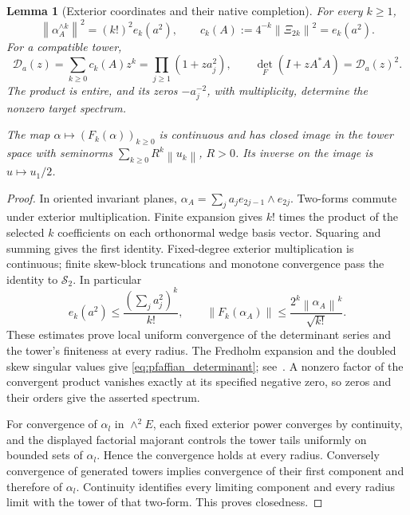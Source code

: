 \documentclass[11pt,a4paper]{amsart}
\numberwithin{equation}{section}
\newtheorem{lemma}[theorem]{Lemma}
\theoremstyle{definition}
\theoremstyle{remark}
\newcommand{\Sch}{\mathcal S}
\newcommand{\norm}[1]{\left\lVert#1\right\rVert}
\begin{document}
\begin{lemma}[Exterior coordinates and their native completion]\label{lem:pfaffian_exterior}
For every $k\ge1$,
\begin{equation}\label{eq:pfaffian_elementary}
 \norm{\alpha_A^{\wedge k}}^2=(k!)^2e_k(a^2),\qquad
 c_k(A):=4^{-k}\norm{\Xi_{2k}}^2=e_k(a^2).
\end{equation}
For a compatible tower,
\begin{equation}\label{eq:pfaffian_determinant}
 \mathscr D_a(z)=\sum_{k\ge0}c_k(A)z^k
 =\prod_{j\ge1}(1+za_j^2),\qquad
 \det_F(I+zA^*A)=\mathscr D_a(z)^2.
\end{equation}
The product is entire, and its zeros $-a_j^{-2}$, with multiplicity, determine the nonzero target spectrum.

The map $\alpha\mapsto(F_k(\alpha))_{k\ge0}$ is continuous and has closed image in the tower space with seminorms
$\sum_{k\ge0}R^k\norm{u_k}$, $R>0$. Its inverse on the image is $u\mapsto u_1/2$.
\end{lemma}
\begin{proof}
In oriented invariant planes, $\alpha_A=\sum_ja_je_{2j-1}\wedge e_{2j}$. Two-forms commute under exterior multiplication. Finite expansion gives $k!$ times the product of the selected $k$ coefficients on each orthonormal wedge basis vector. Squaring and summing gives the first identity. Fixed-degree exterior multiplication is continuous; finite skew-block truncations and monotone convergence pass the identity to $\Sch_2$. In particular
\[
 e_k(a^2)\le\frac{(\sum_ja_j^2)^k}{k!},\qquad
 \norm{F_k(\alpha_A)}\le\frac{2^k\norm{\alpha_A}^k}{\sqrt{k!}}.
\]
These estimates prove local uniform convergence of the determinant series and the tower's finiteness at every radius. The Fredholm expansion and the doubled skew singular values give \eqref{eq:pfaffian_determinant}; see~\cite{Simon,Bornemann}. A nonzero factor of the convergent product vanishes exactly at its specified negative zero, so zeros and their orders give the asserted spectrum.

For convergence of $\alpha_l$ in $\wedge^2 E$, each fixed exterior power converges by continuity, and the displayed factorial majorant controls the tower tails uniformly on bounded sets of $\alpha_l$. Hence the convergence holds at every radius. Conversely convergence of generated towers implies convergence of their first component and therefore of $\alpha_l$. Continuity identifies every limiting component and every radius limit with the tower of that two-form. This proves closedness.
\end{proof}
\end{document}
